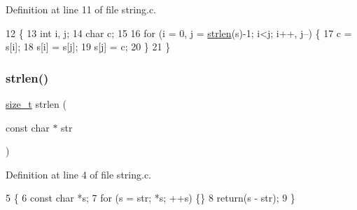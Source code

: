 Definition at line 11 of file string.\+c.


\begin{DoxyCode}
12 \{
13     \textcolor{keywordtype}{int} i, j;
14     \textcolor{keywordtype}{char} c;
15 
16     \textcolor{keywordflow}{for} (i = 0, j = \hyperlink{a00125_a008e171a518fe0e0352f31b245e03875_a008e171a518fe0e0352f31b245e03875}{strlen}(s)-1; i<j; i++, j--) \{
17         c = s[i];
18         s[i] = s[j];
19         s[j] = c;
20     \}
21 \}
\end{DoxyCode}
\mbox{\label{a00128_a008e171a518fe0e0352f31b245e03875_a008e171a518fe0e0352f31b245e03875}} 
\subsubsection{\texorpdfstring{strlen()}{strlen()}}
{\footnotesize\ttfamily \hyperlink{a00140_a29d85914ddff32967d85ada69854206d_a29d85914ddff32967d85ada69854206d}{size\+\_\+t} strlen (\begin{DoxyParamCaption}\item[{const char $\ast$}]{str }\end{DoxyParamCaption})}



Definition at line 4 of file string.\+c.


\begin{DoxyCode}
5 \{
6     \textcolor{keyword}{const} \textcolor{keywordtype}{char} *s;
7     \textcolor{keywordflow}{for} (s = str; *s; ++s) \{\}
8     \textcolor{keywordflow}{return}(s - str);
9 \}
\end{DoxyCode}
